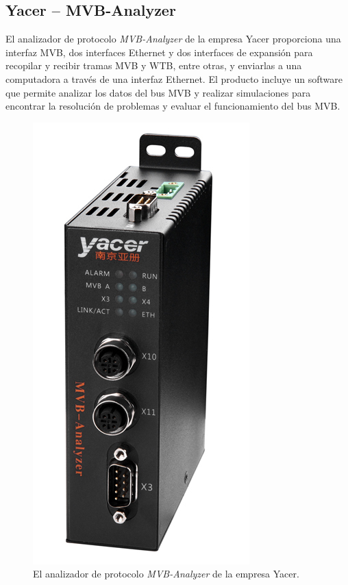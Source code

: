\subsection{Yacer -- MVB-Analyzer}

El analizador de protocolo \textit{MVB-Analyzer} de la empresa Yacer \cite{yacer} proporciona una interfaz MVB, dos interfaces Ethernet y dos interfaces de expansión para recopilar y recibir tramas MVB y WTB, entre otras, y enviarlas a una computadora a través de una interfaz Ethernet. El producto incluye un software que permite analizar los datos del bus MVB y realizar simulaciones para encontrar la resolución de problemas y evaluar el funcionamiento del bus MVB.

\begin{figure}[htbp]
	\centering
	\includegraphics[height=20\baselineskip]{./Figures/yacer.jpg}
	\caption[Yacer -- MVB-Analyzer]{El analizador de protocolo \textit{MVB-Analyzer} de la empresa Yacer.}
\end{figure}

